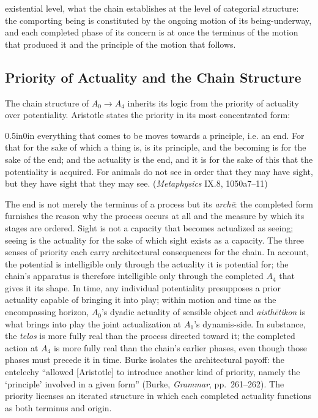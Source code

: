existential level, what the chain establishes at the level of categorial structure: the comporting being is constituted by the ongoing motion of its being-underway, and each completed phase of its concern is at once the terminus of the motion that produced it and the principle of the motion that follows.

\subsection{Priority of Actuality and the Chain Structure}

The chain structure of $A_0 \rightarrow A_4$ inherits its logic from the priority of actuality over potentiality. Aristotle states the priority in its most concentrated form:
\begin{adjustwidth}{0.5in}{0in}
everything that comes to be moves towards a principle, i.e. an end. For that for the sake of which a thing is, is its principle, and the becoming is for the sake of the end; and the actuality is the end, and it is for the sake of this that the potentiality is acquired. For animals do not see in order that they may have sight, but they have sight that they may see. (\textit{Metaphysics} IX.8, 1050a7--11)
\end{adjustwidth}
The end is not merely the terminus of a process but its \textit{archē}: the completed form furnishes the reason why the process occurs at all and the measure by which its stages are ordered. Sight is not a capacity that becomes actualized as seeing; seeing is the actuality for the sake of which sight exists as a capacity. The three senses of priority each carry architectural consequences for the chain. In account, the potential is intelligible only through the actuality it is potential for; the chain's apparatus is therefore intelligible only through the completed $A_4$ that gives it its shape. In time, any individual potentiality presupposes a prior actuality capable of bringing it into play; within motion and time as the encompassing horizon, $A_0$'s dyadic actuality of sensible object and \textit{aisthētikon} is what brings into play the joint actualization at $A_1$'s dynamis-side. In substance, the \textit{telos} is more fully real than the process directed toward it; the completed action at $A_4$ is more fully real than the chain's earlier phases, even though those phases must precede it in time. Burke isolates the architectural payoff: the entelechy ``allowed [Aristotle] to introduce another kind of priority, namely the `principle' involved in a given form'' (Burke, \textit{Grammar}, pp.~261--262). The priority licenses an iterated structure in which each completed actuality functions as both terminus and origin.

